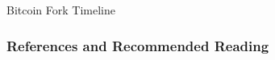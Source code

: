 \documentclass[]{beamer}
\begin{document}
\begin{frame}{Bitcoin Fork Timeline}
	\begin{figure}[h!]
	\center
		\begin{tikzpicture}[scale=0.65, every node/.style={scale=0.65}]
			
  		\end{tikzpicture}
		\label{fig:forkhistory}
	\end{figure}
\end{frame}



%	
		


\begin{frame}%

\frametitle{References and Recommended Reading}
	
	
\end{frame}
\end{document}
